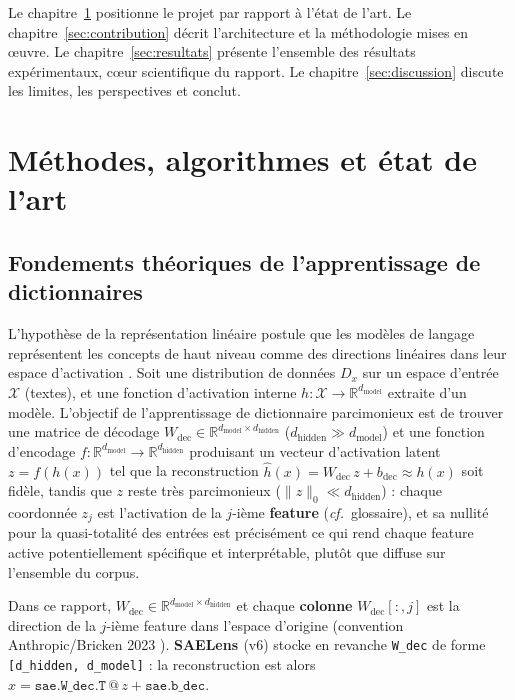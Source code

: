 \documentclass[11pt]{article}
\begin{document}
Le chapitre~\ref{sec:etat-art} positionne le projet par rapport à l'état de
l'art. Le chapitre~\ref{sec:contribution} décrit l'architecture et la
méthodologie mises en œuvre. Le chapitre~\ref{sec:resultats} présente
l'ensemble des résultats expérimentaux, cœur scientifique du rapport. Le
chapitre~\ref{sec:discussion} discute les limites, les perspectives et conclut.

\newpage
\section{Méthodes, algorithmes et état de l'art}
\label{sec:etat-art}

\subsection{Fondements théoriques de l'apprentissage de dictionnaires}

L'hypothèse de la représentation linéaire postule que les modèles de langage
représentent les concepts de haut niveau comme des directions linéaires dans
leur espace d'activation \cite{elhage2022superposition}. Soit une distribution
de données $D_x$ sur un espace d'entrée $\mathcal{X}$ (textes), et une
fonction d'activation interne $h : \mathcal{X} \rightarrow \mathbb{R}^{d_\text{model}}$
extraite d'un modèle. L'objectif de l'apprentissage de dictionnaire
parcimonieux est de trouver une matrice de décodage
$W_\text{dec} \in \mathbb{R}^{d_\text{model} \times d_\text{hidden}}$
($d_\text{hidden} \gg d_\text{model}$) et une fonction d'encodage
$f : \mathbb{R}^{d_\text{model}} \rightarrow \mathbb{R}^{d_\text{hidden}}$
produisant un vecteur d'activation latent $z = f(h(x))$ tel que la
reconstruction $\hat{h}(x) = W_\text{dec}\, z + b_\text{dec} \approx h(x)$ soit
fidèle, tandis que $z$ reste très parcimonieux ($\|z\|_0 \ll d_\text{hidden}$) :
chaque coordonnée $z_j$ est l'activation de la $j$-ième \textbf{feature}
(\emph{cf.}~glossaire), et sa nullité pour la quasi-totalité des entrées est
précisément ce qui rend chaque feature active potentiellement spécifique et
interprétable, plutôt que diffuse sur l'ensemble du corpus.

\begin{definitionbox}
Dans ce rapport, $W_\text{dec} \in \mathbb{R}^{d_\text{model} \times d_\text{hidden}}$
et chaque \textbf{colonne} $W_\text{dec}[:,j]$ est la direction de la $j$-ième
feature dans l'espace d'origine (convention Anthropic/Bricken 2023
\cite{bricken2023monosemanticity}). \textbf{SAELens \cite{bloom2024saelens}} (v6) stocke en revanche
\texttt{W\_dec} de forme \texttt{[d\_hidden, d\_model]} : la reconstruction est
alors $\hat{x} = \texttt{sae.W\_dec.T} \mathbin{@} z + \texttt{sae.b\_dec}$.
\end{definitionbox}
\end{document}
